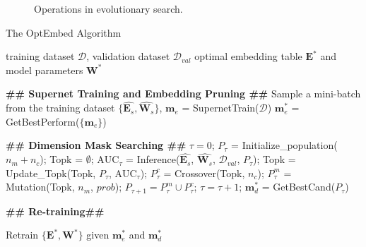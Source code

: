 \documentclass[sigconf]{acmart}
\begin{document}
\begin{figure}[!htbp]
    \centering
    \vspace{-10pt}
    \caption{Operations in evolutionary search.}
    \label{fig:ES}
    \vspace{-10pt}
\end{figure}



\begin{algorithm}
	\caption{The OptEmbed Algorithm} 
    \label{alg:optembed}
	\begin{algorithmic}[1]
		\Require training dataset $\mathcal{D}$, validation dataset $\mathcal{D}_{val}$
        \Ensure optimal embedding table $\mathbf{E}^*$ and model parameters $\mathbf{W}^*$
        
        \State \textbf{\#\# Supernet Training and Embedding Pruning \#\#}
            \State Sample a mini-batch from the training dataset
\State$\{\hat{\mathbf{E}_s},\hat{\mathbf{W}_s}\}$, $\mathbf{m}_e$ = SupernetTrain($\mathbf{\mathcal{D}}$) 
        \EndWhile 
        \State $\mathbf{m}_e^*$ = GetBestPerform($\{\mathbf{m}_e\}$)
        
        \State \textbf{\#\# Dimension Mask Searching \#\#}
        \State $\tau = 0$; $P_{\tau}$ = Initialize\_population($n_m + n_c$); Topk = $\emptyset$;
            \State $\text{AUC}_{\tau}$ = Inference($\hat{\mathbf{E}_s}$, $\hat{\mathbf{W}_s}$, $\mathcal{D}_{val}$, $P_{\tau}$);
            \State Topk = Update\_Topk(Topk, $P_{\tau}$, $\text{AUC}_{\tau}$);
            \State $P^c_{\tau}$ = Crossover(Topk, $n_c$);
            \State $P^m_{\tau}$ = Mutation(Topk, $n_m$, $prob$);
            \State $P_{\tau+1} = P^m_{\tau} \cup P^c_{\tau}$;
            \State $\tau = \tau + 1$;
        \EndWhile
        \State $\mathbf{m}_d^*$ = GetBestCand($P_{\tau}$) 


        \State \textbf{\#\# Re-training\#\#}

\State Retrain $\{\mathbf{E}^*,\mathbf{W}^*\}$ given $\mathbf{m}_e^{*}$ and $\mathbf{m}_d^{*}$ 


\end{algorithmic}
\end{algorithm}
\vspace{-10pt}
\end{document}
